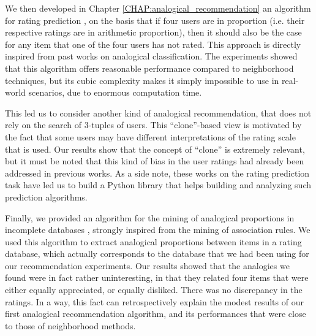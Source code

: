 We then developed in Chapter \ref{CHAP:analogical_recommendation} an algorithm
for rating prediction \cite{HugPraRicISMIS15}, on the basis that if four users
are in proportion (i.e. their respective ratings are in arithmetic proportion),
then it should also be the case for any item that one of the four users has not
rated. This approach is directly inspired from past works on analogical
classification. The experiments showed that this algorithm offers reasonable
performance compared to neighborhood techniques, but its cubic complexity makes
it simply impossible to use in real-world scenarios, due to enormous
computation time.

This led us to consider another kind of analogical recommendation, that does
not rely on the search of $3$-tuples of users. This ``clone''-based view
\cite{HugPraRicSerFuzzIEEE16} is motivated by the fact that some users may
have different interpretations of the rating scale that is used. Our results
show that the concept of ``clone'' is extremely relevant, but it must be noted
that this kind of bias in the user ratings had already been addressed in
previous works. As a side note, these works on the rating prediction task have
led us to build a Python library \cite{Surprise} that helps building and
analyzing such prediction algorithms.

Finally, we provided an algorithm for the mining of analogical proportions in
incomplete databases \cite{HugPraRicSerLFA16}, strongly inspired from the
mining of association rules. We used this algorithm to extract analogical
proportions between items in a rating database, which actually corresponds to
the database that we had been using for our recommendation experiments. Our
results showed that the analogies we found were in fact rather
uninteresting, in that they related four items that were either equally
appreciated, or equally disliked. There was no discrepancy in the ratings. In
a way, this fact can retrospectively explain the modest results of our first
analogical recommendation algorithm, and its performances that were close to
those of neighborhood methods.\\

